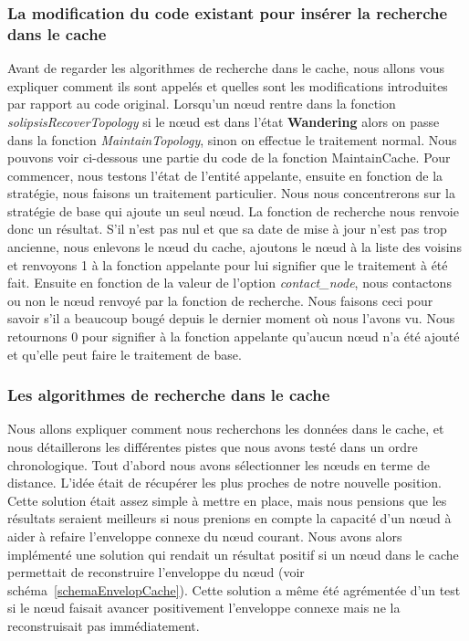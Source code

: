 \subsubsection{La modification du code existant pour insérer la recherche dans le cache}

 Avant de regarder les algorithmes de recherche dans le cache, nous allons vous expliquer comment ils sont appelés et quelles sont les modifications introduites par rapport au code original. Lorsqu'un nœud rentre dans la fonction \textit{solipsisRecoverTopology} si le nœud est dans l'état \textbf{Wandering} alors on passe dans la fonction \textit{MaintainTopology}, sinon on effectue le traitement normal. Nous pouvons voir ci-dessous une partie du code de la fonction MaintainCache. Pour commencer, nous testons l'état de l'entité appelante, ensuite en fonction de la stratégie, nous faisons un traitement particulier. Nous nous concentrerons sur la stratégie de base qui ajoute un seul nœud. La fonction de recherche nous renvoie donc un résultat. S'il n'est pas nul et que sa date de mise à jour n'est pas trop ancienne, nous enlevons le nœud du cache, ajoutons le nœud à la liste des voisins et renvoyons 1 à la fonction appelante pour lui signifier que le traitement à été fait. Ensuite en fonction de la valeur de l'option \textit{contact\_node}, nous contactons ou non le nœud renvoyé par la fonction de recherche. Nous faisons ceci pour savoir s'il a beaucoup bougé depuis le dernier moment où nous l'avons vu. Nous retournons 0 pour signifier à la fonction appelante qu'aucun nœud n'a été ajouté et qu'elle peut faire le traitement de base.

\lstset{numbers=left,basicstyle=\scriptsize, numberstyle=\tiny, stepnumber=5, numbersep=5pt}





\subsubsection{Les algorithmes de recherche dans le cache}
\par Nous allons expliquer comment nous recherchons les données dans le cache, et nous détaillerons les différentes pistes que nous avons testé dans un ordre chronologique. Tout d'abord nous avons sélectionner les nœuds en terme de distance. L'idée  était de récupérer les plus proches de notre nouvelle position. Cette solution était assez simple à mettre en place, mais nous pensions que les résultats seraient meilleurs si nous prenions en compte la capacité d'un nœud à aider à refaire l'enveloppe connexe du nœud courant. Nous avons alors implémenté une solution qui rendait un résultat positif si un nœud dans le cache permettait de reconstruire l'enveloppe du nœud (voir schéma~\ref{schemaEnvelopCache}). Cette solution a même été agrémentée d'un test si le nœud faisait avancer positivement l'enveloppe connexe mais ne la reconstruisait pas immédiatement.

